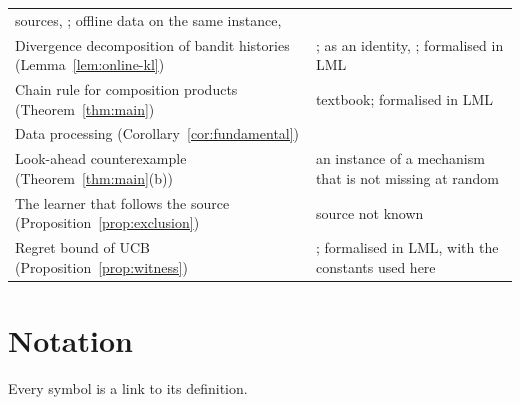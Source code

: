 \documentclass[11pt]{article}
\begin{document}
\begin{center}
\begin{tabular}{@{}p{}p{}@{}}
sources, \citet[Lemma~22]{PMRM26}; offline data on the same instance,
\citet[Appendix~B.1, (10)]{AJSS23} \\
Divergence decomposition of bandit histories (Lemma~\ref{lem:online-kl}) & \citet[Lemma~1]{KCG16};
as an identity, \citet[(8)]{GMS19}; formalised in LML \\
Chain rule for composition products (Theorem~\ref{thm:main}) & textbook; formalised in LML \\
Data processing (Corollary~\ref{cor:fundamental}) & \citet[Lemma~1]{GMS19} \\
Look-ahead counterexample (Theorem~\ref{thm:main}(b)) & an instance of a mechanism that is not
missing at random \citep{R76} \\
The learner that follows the source (Proposition~\ref{prop:exclusion}) & source not known \\
Regret bound of UCB (Proposition~\ref{prop:witness}) & \citet{ACF02}; formalised in LML, with the
constants used here \\
\bottomrule
\end{tabular}
\end{center}

\section{Notation}\label{sec:notation}

Every symbol is a link to its definition.
\end{document}
